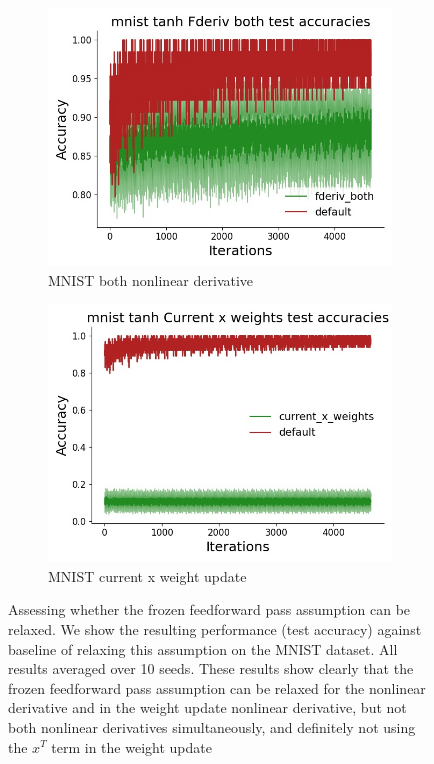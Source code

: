 \begin{figure}[htb]
\begin{subfigure}[b]{0.4\linewidth}
  \end{subfigure} 
  \begin{subfigure}[b]{0.4\linewidth}
    \centering
    \includegraphics[width=0.75\linewidth]{chapter_6_figures/AR/mnist_tanh_Fderiv_both_test_accuracies_prelim_2.jpg} 
    \caption{MNIST both nonlinear derivative} 
  \end{subfigure}%
  \begin{subfigure}[b]{0.4\linewidth}
    \centering
    \includegraphics[width=0.75\linewidth]{chapter_6_figures/AR/mnist_tanh_Current_x_weights_test_accuracies_prelim_2.jpg} 
    \caption{MNIST current x weight update} 
  \end{subfigure} 
  \caption{Assessing whether the frozen feedforward pass assumption can be relaxed. We show the resulting performance (test accuracy) against baseline of relaxing this assumption on the MNIST dataset. All results averaged over 10 seeds. These results show clearly that the frozen feedforward pass assumption can be relaxed for the nonlinear derivative and in the weight update nonlinear derivative, but not both nonlinear derivatives simultaneously, and definitely not using the $x^T$ term in the weight update}
  \label{AR_no_frozen_pass}
\end{figure} 

